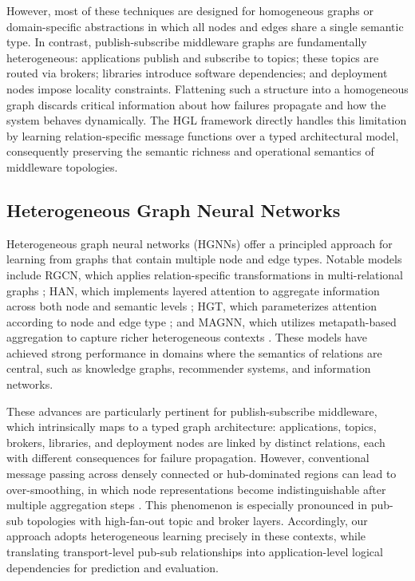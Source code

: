 \documentclass[sigconf,9pt,anonymous]{acmart}
\begin{document}
However, most of these techniques are designed for homogeneous graphs or domain-specific abstractions in which all nodes and edges share a single semantic type. In contrast, publish-subscribe middleware graphs are fundamentally heterogeneous: applications publish and subscribe to topics; these topics are routed via brokers; libraries introduce software dependencies; and deployment nodes impose locality constraints. Flattening such a structure into a homogeneous graph discards critical information about how failures propagate and how the system behaves dynamically. The HGL framework directly handles this limitation by learning relation-specific message functions over a typed architectural model, consequently preserving the semantic richness and operational semantics of middleware topologies.

\subsection{Heterogeneous Graph Neural Networks}

Heterogeneous graph neural networks (HGNNs) offer a principled approach for learning from graphs that contain multiple node and edge types. Notable models include RGCN, which applies relation-specific transformations in multi-relational graphs \cite{schlichtkrull2018rgcn}; HAN, which implements layered attention to aggregate information across both node and semantic levels \cite{wang2019han}; HGT, which parameterizes attention according to node and edge type \cite{hu2020hgt}; and MAGNN, which utilizes metapath-based aggregation to capture richer heterogeneous contexts \cite{fu2020magnn}. These models have achieved strong performance in domains where the semantics of relations are central, such as knowledge graphs, recommender systems, and information networks.

These advances are particularly pertinent for publish-subscribe middleware, which intrinsically maps to a typed graph architecture: applications, topics, brokers, libraries, and deployment nodes are linked by distinct relations, each with different consequences for failure propagation. However, conventional message passing across densely connected or hub-dominated regions can lead to over-smoothing, in which node representations become indistinguishable after multiple aggregation steps \cite{li2018deeper}. This phenomenon is especially pronounced in pub-sub topologies with high-fan-out topic and broker layers. Accordingly, our approach adopts heterogeneous learning precisely in these contexts, while translating transport-level pub-sub relationships into application-level logical dependencies for prediction and evaluation.
\end{document}
